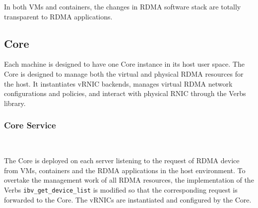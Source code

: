 In both VMs and containers, the changes in RDMA software stack are totally transparent to RDMA applications.

\subsection{\sys Core}

Each machine is designed to have one \sys Core instance in its host user space. The \sys Core is designed to manage both the virtual and physical RDMA resources for the host. It instantiates vRNIC backends, manages virtual RDMA network configurations and policies, and interact with physical RNIC through the Verbs library.



\subsubsection{\textbf{\sys Core Service}}
\
\noindent


The \sys Core is deployed on each server listening to the request of RDMA device from VMs, containers and the RDMA applications in the host environment. To overtake the management work of all RDMA resources, the implementation of the Verbs \texttt{ibv\_get\_device\_list} is modified so that the corresponding request is forwarded to the \sys Core. The vRNICs are instantiated and configured by the \sys Core.


